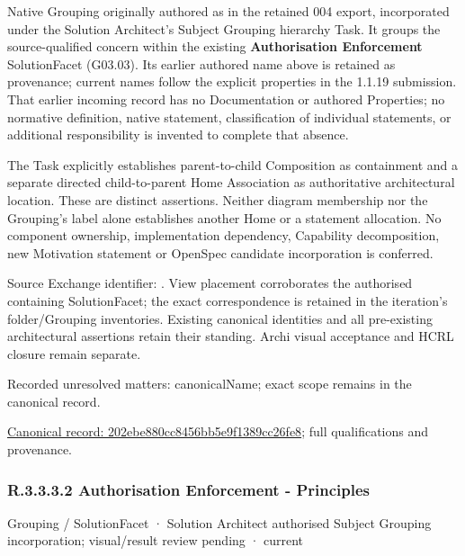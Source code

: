 Native Grouping originally authored as \texttt{} in the retained 004 export,
incorporated under the Solution Architect's Subject Grouping hierarchy Task.
It groups the source-qualified \texttt{} concern within
the existing \textbf{Authorisation Enforcement} SolutionFacet (G03.03). Its earlier authored name above is retained as provenance; current names
follow the explicit properties in the 1.1.19 submission.
That earlier incoming record has no Documentation or authored Properties; no normative
definition, native statement, classification of individual statements, or
additional responsibility is invented to complete that absence.



The Task explicitly establishes parent-to-child Composition as containment and
a separate directed child-to-parent Home Association as authoritative architectural
location. These are distinct assertions. Neither diagram membership nor the
Grouping's label alone establishes another Home or a statement allocation.
No component ownership, implementation dependency, Capability decomposition,
new Motivation statement or OpenSpec candidate incorporation is conferred.



Source Exchange identifier: \texttt{}. View placement corroborates
the authorised containing SolutionFacet; the exact correspondence is retained in the
iteration's folder/Grouping inventories. Existing canonical identities and all
pre-existing architectural assertions retain their standing. Archi visual
acceptance and HCRL closure remain separate.


{\small Recorded unresolved matters: canonicalName; exact scope remains in the canonical record.}\par
{\footnotesize \href{../../../../../../../continuum/grouping/202ebe880cc8456bb5e9f1389cc26fe8.md}{Canonical record: 202ebe880cc8456bb5e9f1389cc26fe8}; full qualifications and provenance.}\par
\subsubsection*{R.3.3.3.2 Authorisation Enforcement - Principles}
\label{navigation:R.3.3.3.2}

\label{element:f85948e2b4e145a4b56ab369c1a70c22}
{\small Grouping / SolutionFacet · Solution Architect authorised Subject Grouping incorporation; visual/result review pending · current}\par

